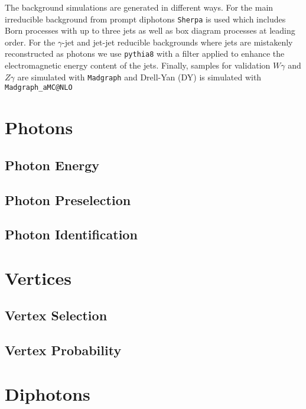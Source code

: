 The background simulations are generated in different ways. For the main irreducible background from prompt diphotons \texttt{Sherpa} is used which includes Born processes with up to three jets as well as box diagram processes at leading order. 
For the $\gamma$-jet and jet-jet reducible backgrounds where jets are mistakenly reconstructed as photons we use \texttt{pythia8} with a filter applied to enhance the electromagnetic energy content of the jets. 
Finally, samples for validation $W\gamma$ and $Z\gamma$ are simulated with \texttt{Madgraph} and Drell-Yan (DY) is simulated with \texttt{Madgraph_{}aMC@NLO}



\section{Photons}

\subsection{Photon Energy}

\subsection{Photon Preselection}

\subsection{Photon Identification}



\section{Vertices}

\subsection{Vertex Selection}

\subsection{Vertex Probability}



\section{Diphotons}

